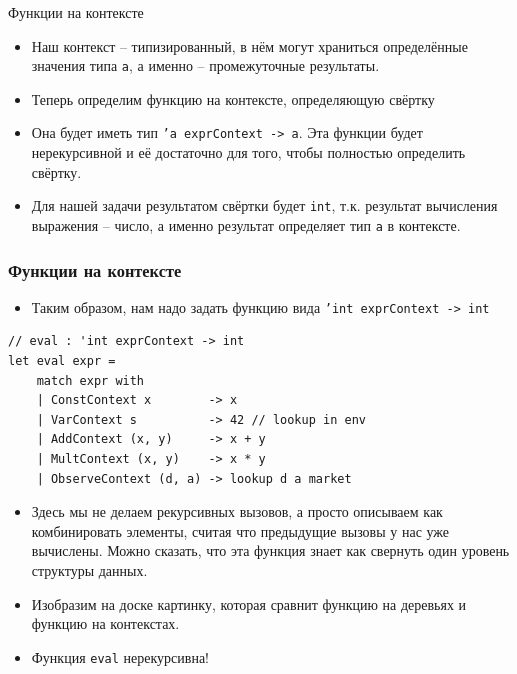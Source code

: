\documentclass{beamer}
\begin{document}
\begin{frame}{Функции на контексте}

\begin{itemize}
\item
  Наш контекст -- типизированный, в нём могут храниться определённые
  значения типа \texttt{а}, а именно -- промежуточные результаты.
\item
  Теперь определим функцию на контексте, определяющую свёртку
\item
  Она будет иметь тип \texttt{'a exprContext -\textgreater{} a}. Эта
  функции будет нерекурсивной и её достаточно для того, чтобы полностью
  определить свёртку.
\item
  Для нашей задачи результатом свёртки будет \texttt{int}, т.к.
  результат вычисления выражения -- число, а именно результат определяет
  тип \texttt{а} в контексте.
\end{itemize}
\end{frame}

\begin{frame}[fragile]
\frametitle{Функции на контексте}

\begin{itemize}
\item
  Таким образом, нам надо задать функцию вида
  \texttt{'int exprContext -\textgreater{} int}
\end{itemize}
\begin{lstlisting}
// eval : 'int exprContext -> int 
let eval expr = 
    match expr with
    | ConstContext x        -> x
    | VarContext s          -> 42 // lookup in env 
    | AddContext (x, y)     -> x + y
    | MultContext (x, y)    -> x * y
    | ObserveContext (d, a) -> lookup d a market
\end{lstlisting}
\begin{itemize}
\item
  Здесь мы не делаем рекурсивных вызовов, а просто описываем как
  комбинировать элементы, считая что предыдущие вызовы у нас уже
  вычислены. Можно сказать, что эта функция знает как свернуть один
  уровень структуры данных.
\item
  Изобразим на доске картинку, которая сравнит функцию на деревьях и
  функцию на контекстах.
\item
  Функция \texttt{eval} нерекурсивна!
\end{itemize}
\end{frame}
\end{document}
